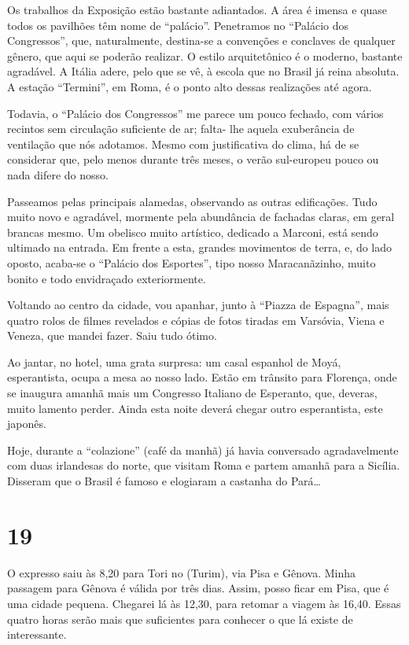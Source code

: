 Os trabalhos da Exposição estão bastante adiantados. A área é imensa e quase todos os pavilhões têm nome de ``palácio''. Penetramos no ``Palácio dos Congressos'', que, naturalmente, destina-se a convenções e conclaves de qualquer gênero, que aqui se poderão realizar. O estilo arquitetônico é o moderno, bastante agradável. A Itália adere, pelo que se vê, à escola que no Brasil já reina absoluta. A estação ``Termini'', em Roma, é o ponto alto dessas realizações até agora.

Todavia, o ``Palácio dos Congressos'' me parece um pouco fechado, com vários recintos sem circulação suficiente de ar; falta- lhe aquela exuberância de ventilação que nós adotamos. Mesmo com justificativa do clima, há de se considerar que, pelo menos durante três meses, o verão sul-europeu pouco ou nada difere do nosso.

Passeamos pelas principais alamedas, observando as outras edificações. Tudo muito novo e agradável, mormente pela abundância de fachadas claras, em geral brancas mesmo. Um obelisco muito artístico, dedicado a Marconi, está sendo ultimado na entrada. Em frente a esta, grandes movimentos de terra, e, do lado oposto, acaba-se o ``Palácio dos Esportes'', tipo nosso Maracanãzinho, muito bonito e todo envidraçado exteriormente.

Voltando ao centro da cidade, vou apanhar, junto à ``Piazza de Espagna'', mais quatro rolos de filmes revelados e cópias de fotos tiradas em Varsóvia, Viena e Veneza, que mandei fazer. Saiu tudo ótimo.

Ao jantar, no hotel, uma grata surpresa: um casal espanhol de Moyá, esperantista, ocupa a mesa ao nosso lado. Estão em trânsito para Florença, onde se inaugura amanhã mais um Congresso Italiano de Esperanto, que, deveras, muito lamento perder. Ainda esta noite deverá chegar outro esperantista, este japonês.

Hoje, durante a ``colazione'' (café da manhã) já havia conversado agradavelmente com duas irlandesas do norte, que visitam Roma e partem amanhã para a Sicília. Disseram que o Brasil é famoso e elogiaram a castanha do Pará\ldots

\section*{19 \adfflatleafright {}}
O expresso saiu às 8,20 para Tori no (Turim), via Pisa e Gênova. Minha passagem para Gênova é válida por três dias. Assim, posso ficar em Pisa, que é uma cidade pequena. Chegarei lá às 12,30, para retomar a viagem às 16,40. Essas quatro horas serão mais que suficientes para conhecer o que lá existe de interessante.

